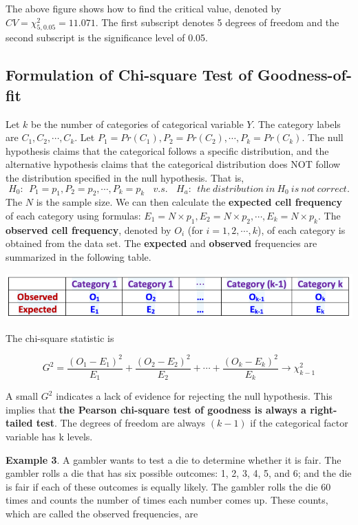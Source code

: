 \documentclass[
]{article}
\begin{document}
The above figure shows how to find the critical value, denoted by
\(CV = \chi^2_{5, 0.05} = 11.071\). The first subscript denotes 5
degrees of freedom and the second subscript is the significance level of
0.05.

\hypertarget{formulation-of-chi-square-test-of-goodness-of-fit}{%
\subsection{Formulation of Chi-square Test of
Goodness-of-fit}\label{formulation-of-chi-square-test-of-goodness-of-fit}}

Let \(k\) be the number of categories of categorical variable \(Y\). The
category labels are \(C_1, C_2, \cdots, C_k\). Let
\(P_1 = Pr(C_1), P_2 = Pr(C_2), \cdots, P_k = Pr(C_k)\). The null
hypothesis claims that the categorical follows a specific distribution,
and the alternative hypothesis claims that the categorical distribution
does NOT follow the distribution specified in the null hypothesis. That
is, \[
H_0:\ \ P_1 = p_1, P_2 = p_2, \cdots, P_k = p_k \ \ \ \ v.s. \  \  \  \  H_a: \ \ the \ distribution \ in \ H_0 \ is \ not \ correct.
\] The \(N\) is the sample size. We can then calculate the
\textbf{expected cell frequency} of each category using formulas:
\(E_1 = N\times p_1, E_2 = N \times p_2, \cdots, E_k = N \times p_k\).
The \textbf{observed cell frequency}, denoted by \(O_i\) (for
\(i=1,2, \cdots, k\)), of each category is obtained from the data set.
The \textbf{expected} and \textbf{observed} frequencies are summarized
in the following table.

\begin{center}\includegraphics[width=0.6\linewidth]{week13/obsExpTable} \end{center}

The chi-square statistic is

\[
G^2 = \frac{(O_1-E_1)^2}{E_1} + \frac{(O_2-E_2)^2}{E_2} + \cdots + \frac{(O_k-E_k)^2}{E_k} \to \chi_{k-1}^2
\]

A small \(G^2\) indicates a lack of evidence for rejecting the null
hypothesis. This implies that \textbf{the Pearson chi-square test of
goodness is always a right-tailed test}. The degrees of freedom are
always \((k-1)\) if the categorical factor variable has k levels.

\textbf{Example 3}. A gambler wants to test a die to determine whether
it is fair. The gambler rolls a die that has six possible outcomes: 1,
2, 3, 4, 5, and 6; and the die is fair if each of these outcomes is
equally likely. The gambler rolls the die 60 times and counts the number
of times each number comes up. These counts, which are called the
observed frequencies, are
\end{document}
